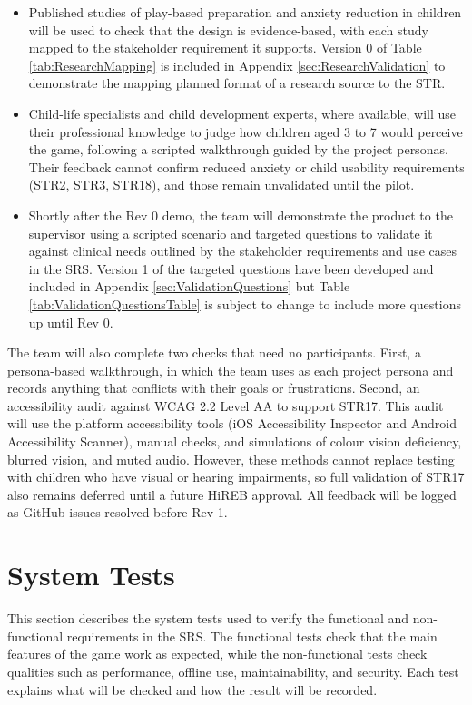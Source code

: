 \documentclass[10pt,titlepage]{article}
\begin{document}
\begin{itemize}
  \item Published studies of play-based preparation and anxiety reduction in children will be used to check that the design is 
  evidence-based, with each study mapped to the stakeholder requirement it supports. Version 0 of Table \ref{tab:ResearchMapping} 
  is included in Appendix \ref{sec:ResearchValidation} to demonstrate the mapping planned format of a research source to the STR.
  \item Child-life specialists and child development experts, where available, will use their professional knowledge to 
  judge how children aged 3 to 7 would perceive the game, following a scripted walkthrough guided by the project 
  personas. Their feedback cannot confirm reduced anxiety or child usability requirements (STR2, STR3, STR18), and those remain 
  unvalidated until the pilot.
  \item Shortly after the Rev 0 demo, the team will demonstrate the product to the supervisor using a scripted scenario and 
  targeted questions to validate it against clinical needs outlined by the stakeholder requirements and use cases in the SRS. 
  Version 1 of the targeted questions have been developed and included in Appendix \ref{sec:ValidationQuestions} but Table 
  \ref{tab:ValidationQuestionsTable} is subject to change to include more questions up until Rev 0.
\end{itemize} 

The team will also complete two checks that need no participants. First, a persona-based walkthrough, in which the team 
uses \progname{} as each project persona and records anything that conflicts with their goals or frustrations. Second, an 
accessibility audit against WCAG 2.2 Level AA to support STR17. This audit will use the platform accessibility 
tools (iOS Accessibility Inspector and Android Accessibility Scanner), manual checks, and simulations of colour vision 
deficiency, blurred vision, and muted audio. However, these methods cannot replace testing with children 
who have visual or hearing impairments, so full validation of STR17 also remains deferred until a future HiREB approval. 
All feedback will be logged as GitHub issues resolved before Rev 1. 


\newpage
\section{System Tests}

This section describes the system tests used to verify the functional and
non-functional requirements in the SRS. The functional tests check that
the main features of the game work as expected, while the non-functional tests
check qualities such as performance, offline use, maintainability, and security.
Each test explains what will be checked and how the result will be recorded.
\end{document}
